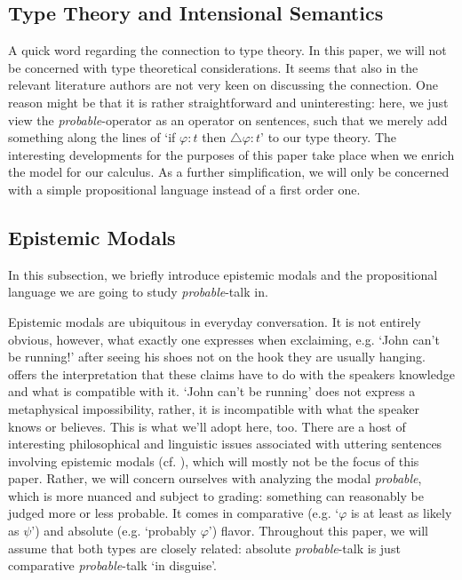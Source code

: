 \documentclass{article}
\theoremstyle{definition}
\begin{document}
\subsection{Type Theory and Intensional Semantics}
A quick word regarding the connection to type theory. In this paper, we will not be concerned with type theoretical considerations. It seems that also in the relevant literature authors are not very keen on discussing the connection. One reason might be that it is rather straightforward and uninteresting: here, we just view the \emph{probable}-operator as an operator on sentences, such that we merely add something along the lines of `if $\varphi:t$ then $\triangle \varphi:t$' to our type theory. The interesting developments for the purposes of this paper take place when we enrich the model for our calculus. As a further simplification, we will only be concerned with a simple propositional language instead of a first order one.

\subsection{Epistemic Modals}

In this subsection, we briefly introduce epistemic modals and the propositional language we are going to study \emph{probable}-talk in.

Epistemic modals are ubiquitous in everyday conversation.
It is not entirely obvious, however, what exactly one expresses when exclaiming, e.g. `John can't be running!' after seeing his shoes not on the hook they are usually hanging.
\textcite{macfarlane11_are_asses_sensit} offers the interpretation that these claims have to do with the speakers knowledge and what is compatible with it.
`John can't be running' does not express a metaphysical impossibility, rather, it is incompatible with what the speaker knows or believes.
This is what we'll adopt here, too.
There are a host of interesting philosophical and linguistic issues associated with uttering sentences involving epistemic modals (cf. \cite{yalcin07_epist_modal}), which will mostly not be the focus of this paper.
Rather, we will concern ourselves with analyzing the modal \emph{probable}, which is more nuanced and subject to grading:
something can reasonably be judged more or less probable. It comes in comparative (e.g. `$\varphi$ is at least as likely as $\psi$') and absolute (e.g. `probably $\varphi$') flavor.
Throughout this paper, we will assume that both types are closely related: absolute \emph{probable}-talk is just comparative \emph{probable}-talk `in disguise'.
\end{document}
